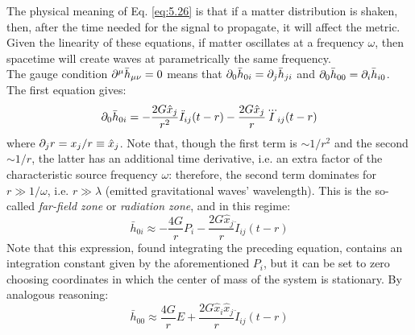 The physical meaning of Eq. \ref{eq:5.26} is that if a matter distribution is shaken, then, after the time needed for the signal to propagate, it will affect the metric. Given the linearity of these equations, if matter oscillates at a frequency $ \omega $, then spacetime will create waves at parametrically the same frequency.\\
The gauge condition $ \partial^\mu \bar{h}_{\mu \nu} = 0 $ means that $ \partial_0 \bar{h}_{0i} = \partial_j \bar{h}_{ji} $ and $ \partial_0 \bar{h}_{00} = \partial_i \bar{h}_{i0} $. The first equation gives:
\begin{equation*}
  \partial_0 \bar{h}_{0i} = - \frac{2G \hat{x}_j}{r^2} \ddot{I}_{ij}(t - r) - \frac{2G \hat{x}_j}{r} \dddot{I}_{ij}(t - r)
\end{equation*}
where $ \partial_j r = x_j / r \equiv \hat{x}_j $. Note that, though the first term is $ \sim 1/r^2 $ and the second $ \sim 1/r $, the latter has an additional time derivative, i.e. an extra factor of the characteristic source frequency $ \omega $: therefore, the second term dominates for $ r \gg 1/\omega $, i.e. $ r \gg \lambda $ (emitted gravitational waves' wavelength). This is the so-called \textit{far-field zone} or \textit{radiation zone}, and in this regime:
\begin{equation}
  \bar{h}_{0i} \approx - \frac{4G}{r} P_i - \frac{2G \hat{x}_j}{r} \ddot{I}_{ij} (t - r)
  \label{eq:5.27}
\end{equation}
Note that this expression, found integrating the preceding equation, contains an integration constant given by the aforementioned $ P_i $, but it can be set to zero choosing coordinates in which the center of mass of the system is stationary. By analogous reasoning:
\begin{equation}
  \bar{h}_{00} \approx \frac{4G}{r} E + \frac{2G \hat{x}_i \hat{x}_j}{r} \ddot{I}_{ij} (t - r)
  \label{eq:5.28}
\end{equation}

